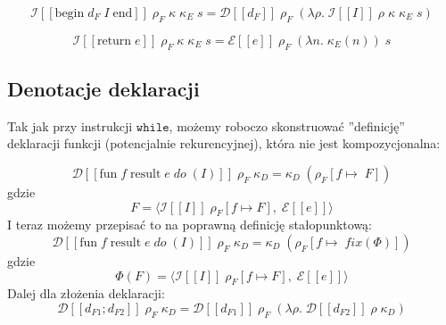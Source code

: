 \documentclass[a4paper]{article}
\begin{document}
$$
\mathcal{I}[\![ \text{begin} \; d_F \; I \; \text{end} ]\!] \; \rho_F \; \kappa \; \kappa_E \; s = 
\mathcal{D}[\![ d_F ]\!] \; \rho_F \; (\lambda \rho. \;
\mathcal{I}[\![ I ]\!] \; \rho \; \kappa \; \kappa_E \; s )
$$

$$
\mathcal{I}[\![ \text{return} \; e ]\!] \; \rho_F \; \kappa \; \kappa_E \; s = 
 \mathcal{E}[\![e]\!] \; \rho_F \; (\lambda n. \; \kappa_E(n)) \; s

$$


\subsection*{Denotacje deklaracji}


Tak jak przy instrukcji $\texttt{while}$, możemy roboczo skonstruować  ''definicję'' deklaracji funkcji (potencjalnie rekurencyjnej), która nie jest kompozycjonalna:

$$
\mathcal{D}[\![ \text{fun} \; f \; \text{result} \; e \; do \; (I) ]\!] \; \rho_F \; \kappa_D = \kappa_D \; (\rho_F [ f \mapsto \; F ])
$$
gdzie
$$
F = \langle 
\mathcal{I}[\![ I ]\!] \; \rho_F [f  \mapsto F]
, \; \mathcal{E}[\![ e ]\!] \rangle
$$
I teraz możemy przepisać to na poprawną definicję stałopunktową:
$$
\mathcal{D}[\![ \text{fun} \; f \; \text{result} \; e \; do \; (I) ]\!] \; \rho_F \; \kappa_D = \kappa_D \; (\rho_F [ f \mapsto \; fix(\Phi) ])
$$
gdzie
$$
\Phi(F) = \langle 
\mathcal{I}[\![ I ]\!] \; \rho_F [f  \mapsto F]
, \; \mathcal{E}[\![ e ]\!] \rangle
$$
Dalej dla złożenia deklaracji:
$$
\mathcal{D}[\![ d_{F1} ; d_{F2} ]\!] \; \rho_F \; \kappa_D = 
\mathcal{D}[\![ d_{F1} ]\!] \; \rho_F \; (\lambda \rho . \;
\mathcal{D}[\![ d_{F2} ]\!] \; \rho \; \kappa_D)
$$
\end{document}
